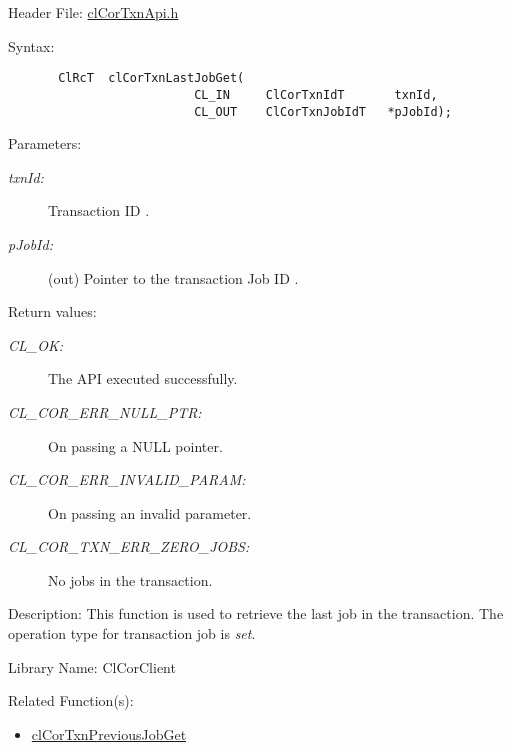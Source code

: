 \begin{Desc}
\item[Header File:]\hyperlink{cl_cor_txn_api_8h}{cl\-Cor\-Txn\-Api.h}\end{Desc}
\begin{Desc}
\item[Syntax:]

\footnotesize\begin{verbatim}       ClRcT  clCorTxnLastJobGet(
                          CL_IN     ClCorTxnIdT       txnId,
                          CL_OUT    ClCorTxnJobIdT   *pJobId);
\end{verbatim}
\normalsize
\end{Desc}
\begin{Desc}
\item[Parameters:]
\begin{description}
\item[{\em txn\-Id:}]Transaction ID . \item[{\em p\-Job\-Id:}](out) Pointer to the transaction Job ID .\end{description}
\end{Desc}
\begin{Desc}
\item[Return values:]
\begin{description}
\item[{\em CL\_\-OK:}]The API executed successfully. \item[{\em CL\_\-COR\_\-ERR\_\-NULL\_\-PTR:}]On passing a NULL pointer. \item[{\em CL\_\-COR\_\-ERR\_\-INVALID\_\-PARAM:}]On passing an invalid parameter. \item[{\em CL\_\-COR\_\-TXN\_\-ERR\_\-ZERO\_\-JOBS:}]No jobs in the transaction.\end{description}
\end{Desc}
\begin{Desc}
\item[Description:]This function is used to retrieve the last job in the transaction. The operation type for transaction job is {\em set\/}.\end{Desc}
\begin{Desc}
\item[Library Name:]Cl\-Cor\-Client\end{Desc}
\begin{Desc}
\item[Related Function(s):]\begin{itemize}
\item \hyperlink{group__group13}{cl\-Cor\-Txn\-Previous\-Job\-Get} \end{itemize}
\end{Desc}
